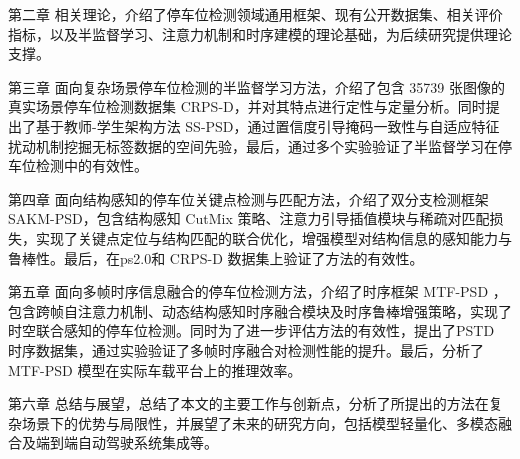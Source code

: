 第二章 相关理论，介绍了停车位检测领域通用框架、现有公开数据集、相关评价指标，以及半监督学习、注意力机制和时序建模的理论基础，为后续研究提供理论支撑。

第三章 面向复杂场景停车位检测的半监督学习方法，介绍了包含 35739 张图像的真实场景停车位检测数据集 CRPS-D，并对其特点进行定性与定量分析。同时提出了基于教师-学生架构方法 SS-PSD，通过置信度引导掩码一致性与自适应特征扰动机制挖掘无标签数据的空间先验，最后，通过多个实验验证了半监督学习在停车位检测中的有效性。

第四章 面向结构感知的停车位关键点检测与匹配方法，介绍了双分支检测框架 SAKM-PSD，包含结构感知 CutMix 策略、注意力引导插值模块与稀疏对匹配损失，实现了关键点定位与结构匹配的联合优化，增强模型对结构信息的感知能力与鲁棒性。最后，在ps2.0和 CRPS-D 数据集上验证了方法的有效性。

第五章 面向多帧时序信息融合的停车位检测方法，介绍了时序框架 MTF-PSD ，包含跨帧自注意力机制、动态结构感知时序融合模块及时序鲁棒增强策略，实现了时空联合感知的停车位检测。同时为了进一步评估方法的有效性，提出了PSTD 时序数据集，通过实验验证了多帧时序融合对检测性能的提升。最后，分析了 MTF-PSD 模型在实际车载平台上的推理效率。

第六章 总结与展望，总结了本文的主要工作与创新点，分析了所提出的方法在复杂场景下的优势与局限性，并展望了未来的研究方向，包括模型轻量化、多模态融合及端到端自动驾驶系统集成等。

